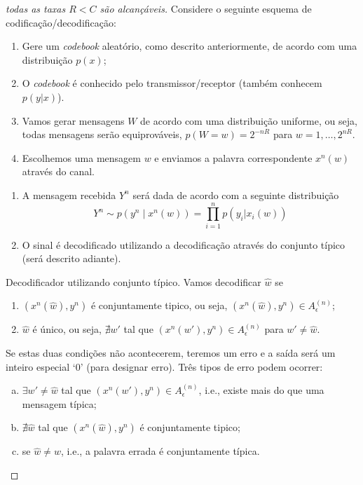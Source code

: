 \begin{frame}[allowframebreaks]
\begin{proof}[todas as taxas $R < C$ são alcançáveis]
  \proofbreak

  Considere o seguinte esquema de codificação/decodificação:
	\begin{enumerate}
	\item Gere um \textit{codebook} aleatório, como descrito anteriormente, de acordo 
		com uma distribuição $p(x)$;
	\item O \textit{codebook} é conhecido pelo transmissor/receptor (também conhecem $p(y|x)$). 
	\item Vamos gerar mensagens $W$ de acordo com uma distribuição uniforme, ou seja,
		todas mensagens serão equiprováveis, $p(W=w) = 2^{-nR}$ para $w=1, \ldots, 2^{nR}$.
	\item Escolhemos uma mensagem $w$ e enviamos a palavra correspondente $x^n(w)$ através do canal.
	\asuivre
	\end{enumerate}
	\proofbreak
	\begin{enumerate}
	\suite
	\item A mensagem recebida $Y^n$ será dada de acordo com a seguinte distribuição
		\begin{equation}
		Y^n \sim p(y^n \mid x^n(w)) = \prod_{i=1}^{n} p(y_i | x_i(w))
		\end{equation}
	\item O sinal é decodificado utilizando a decodificação através do conjunto típico (será descrito adiante).	
	\end{enumerate}
 
  \proofbreak

  Decodificador utilizando conjunto típico.
  Vamos decodificar $\hat{w}$ se
	\begin{enumerate}
	\item $\left( x^n(\hat{w}), y^n \right)$ é conjuntamente tipico, ou seja, $\left( x^n(\hat{w}), y^n \right) \in A_{\epsilon}^{(n)}$;
	\item $\hat{w}$ é único, ou seja, $\nexists w'$ tal que $\left( x^n(w'), y^n \right) \in A_{\epsilon}^{(n)}$ para $w' \neq \hat{w}$.
	\end{enumerate}
  Se estas duas condições não acontecerem, teremos um erro e a saída será um inteiro especial `0' (para designar erro).
  Três tipos de erro podem ocorrer:
  \begin{enumerate}[a)]
  \item  $\exists w' \neq \hat{w}$ tal que $\left( x^n(w'), y^n \right) \in A_{\epsilon}^{(n)}$, i.e., 
	existe mais do que uma mensagem típica;
  \item $\nexists \hat{w}$ tal que $\left( x^n(\hat{w}), y^n \right)$ é conjuntamente tipico;
  \item se $\hat{w} \neq w$, i.e., a palavra errada é conjuntamente típica.
  \end{enumerate}


\end{proof}
\end{frame}
